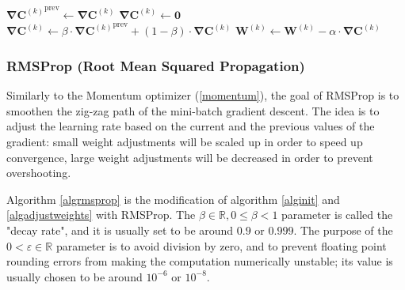 \documentclass[titlepage]{article}
\begin{document}
        \begin{algorithm}
          \caption{%
            Algorithm \ref{algmomentum} with matrix-vector notation.
          }
          \begin{algorithmic}
                \State $
                  {\mathbf{\nabla C}^{(k)}}^\text{prev} \gets
                    \mathbf{\nabla C}^{(k)}
                $
                \State $\mathbf{\nabla C}^{(k)} \gets \mathbf{0}$
              \EndFor
            \EndProcedure
                \State $
                  \mathbf{\nabla C}^{(k)} \gets
                    \beta \cdot {\mathbf{\nabla C}^{(k)}}^\text{prev}
                    + \left( 1 - \beta \right) \cdot \mathbf{\nabla C}^{(k)}
                $
                \State $
                  \mathbf{W}^{(k)} \gets
                    \mathbf{W}^{(k)} - \alpha \cdot \mathbf{\nabla C}^{(k)}
                $
              \EndFor
            \EndProcedure
          \end{algorithmic}
        \end{algorithm}

      \subsubsection{RMSProp (Root Mean Squared Propagation)}\label{rmsprop}

        Similarly to the Momentum optimizer (\ref{momentum}), the goal of
        RMSProp is to smoothen the zig-zag path of the mini-batch gradient
        descent. The idea is to adjust the learning rate based on the current
        and the previous values of the gradient: small weight adjustments will
        be scaled up in order to speed up convergence, large weight adjustments
        will be decreased in order to prevent overshooting.

        Algorithm \ref{algrmsprop} is the modification of algorithm
        \ref{alginit} and \ref{algadjustweights} with RMSProp. The
        $\beta \in \mathbb{R}, 0 \leq \beta < 1$ parameter is called the "decay
        rate", and it is usually set to be around $0.9$ or $0.999$. The purpose
        of the $0 < \varepsilon \in \mathbb{R}$ parameter is to avoid division
        by zero, and to prevent floating point rounding errors from making the
        computation numerically unstable; its value is usually chosen to be
        around $10^{-6}$ or $10^{-8}$.
\end{document}
